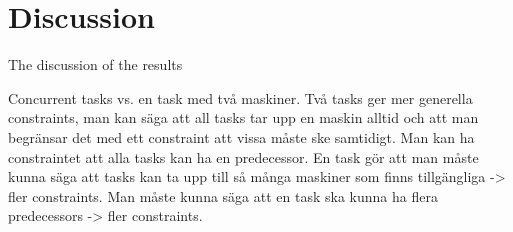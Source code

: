 \chapter{Discussion} 
The discussion of the results

Concurrent tasks vs. en task med två maskiner.
Två tasks ger mer generella constraints, man kan säga att all tasks tar upp en maskin alltid och att man begränsar det med ett constraint att vissa måste ske samtidigt. Man kan ha constraintet att alla tasks kan ha en predecessor.
En task gör att man måste kunna säga att tasks kan ta upp till så många maskiner som finns tillgängliga -> fler constraints. Man måste kunna säga att en task ska kunna ha flera predecessors -> fler constraints.

